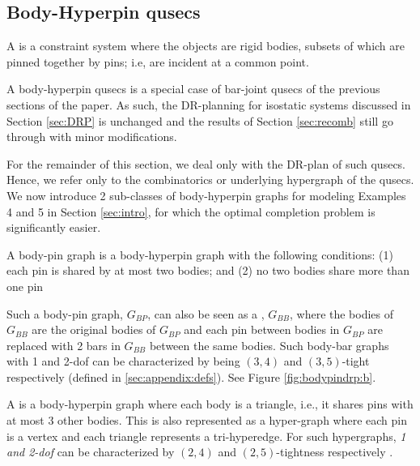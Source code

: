 \subsection{Body-Hyperpin qusecs}


\begin{definition}
    A  is a constraint system where the objects are rigid bodies,  subsets of which are pinned together by pins; i.e, are incident at a common point.
\end{definition}

\begin{remark*}\label{rem:bodypin_is_barjoint}
    A body-hyperpin qusecs is a special case of bar-joint qusecs of the previous sections of the paper. As such, the DR-planning for isostatic systems discussed in Section \ref{sec:DRP} is unchanged and the results of Section \ref{sec:recomb} still go through with minor modifications.
\end{remark*}

For the remainder of this section, we deal only with the DR-plan of such qusecs. Hence, we refer only to the combinatorics or underlying hypergraph of the qusecs. We now introduce 2 sub-classes of body-hyperpin graphs for modeling Examples 4 and 5 in Section \ref{sec:intro}, for which the optimal completion problem is significantly easier.

\begin{definition}\label{def:body-pin}
    A body-pin graph is a body-hyperpin graph with the following conditions:
    (1) each pin is shared by at most two bodies; and
    (2) no two bodies share more than one pin

    Such a body-pin graph, $G_{BP}$, can also be seen as a , $G_{BB}$, where the bodies of $G_{BB}$ are the original bodies of $G_{BP}$ and each pin between bodies in $G_{BP}$ are replaced with 2 bars in $G_{BB}$ between the same bodies.
    Such body-bar graphs with 1 and 2-dof can be characterized by being $(3,4)$ and $(3,5)$-tight respectively \cite{Lee:2007:PGA} \cite{streinu2009sparse} (defined in \ref{sec:appendix:defs}). See Figure \ref{fig:bodypindrp:b}.
\end{definition}

\begin{definition}
    A  is a body-hyperpin graph where each body is a triangle, i.e., it shares  pins with at most 3 other bodies. This is also represented as a hyper-graph where each pin is a vertex and each triangle represents a tri-hyperedge. For such hypergraphs, {\em 1 and 2-dof} can be characterized by $(2,4)$ and $(2,5)$-tightness respectively \cite{Lee:2007:PGA} \cite{streinu2009sparse}.
\end{definition}

